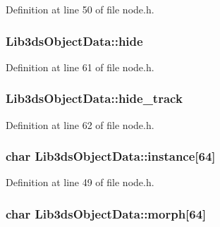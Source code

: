 Definition at line 50 of file node.\-h.

\hypertarget{struct_lib3ds_object_data_a9d44dcb8dd989e6c235061834a88c8fb}{
\subsubsection[{hide}]{ Lib3ds\-Object\-Data\-::hide}}\label{struct_lib3ds_object_data_a9d44dcb8dd989e6c235061834a88c8fb}


Definition at line 61 of file node.\-h.

\hypertarget{struct_lib3ds_object_data_af9fd4cb9c02ec3c44ba353e98892f383}{
\subsubsection[{hide\-\_\-track}]{ Lib3ds\-Object\-Data\-::hide\-\_\-track}}\label{struct_lib3ds_object_data_af9fd4cb9c02ec3c44ba353e98892f383}


Definition at line 62 of file node.\-h.

\hypertarget{struct_lib3ds_object_data_ada197066312c4674728546881dcacf6d}{
\subsubsection[{instance}]{\setlength{\rightskip}{0pt plus 5cm}char Lib3ds\-Object\-Data\-::instance\mbox{[}64\mbox{]}}}\label{struct_lib3ds_object_data_ada197066312c4674728546881dcacf6d}


Definition at line 49 of file node.\-h.

\hypertarget{struct_lib3ds_object_data_ab75f8de80a09fcdcf77f71341be6030a}{
\subsubsection[{morph}]{\setlength{\rightskip}{0pt plus 5cm}char Lib3ds\-Object\-Data\-::morph\mbox{[}64\mbox{]}}}\label{struct_lib3ds_object_data_ab75f8de80a09fcdcf77f71341be6030a}



